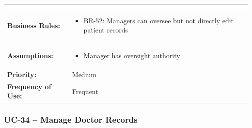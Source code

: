 \documentclass[12pt,a4paper]{article}
\begin{document}
\begin{longtable}{|p{4.5cm}|p{10.5cm}|}
\begin{itemize}
\end{itemize} \\
\hline
\textbf{Business Rules:} &
\begin{itemize}
  \item BR-52: Managers can oversee but not directly edit patient records
\end{itemize} \\
\hline
\textbf{Assumptions:} &
\begin{itemize}
  \item Manager has oversight authority
\end{itemize} \\
\hline
\textbf{Priority:} & Medium \\
\hline
\textbf{Frequency of Use:} & Frequent \\
\hline
\end{longtable}

\subsubsection{UC-34 – Manage Doctor Records}
\end{document}
